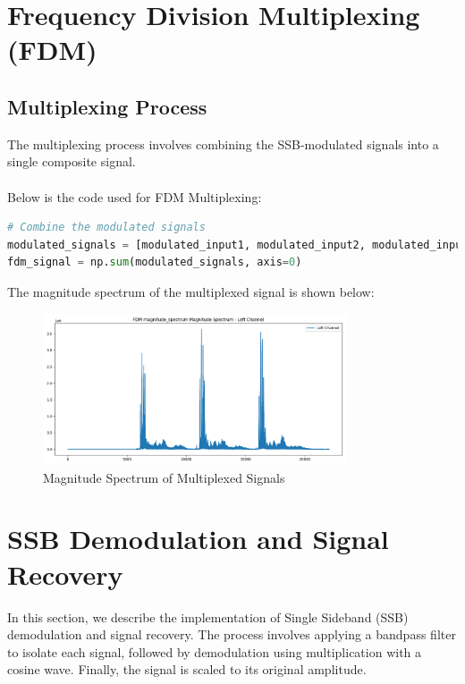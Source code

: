 \documentclass[12pt,a4paper]{article}
\begin{document}
\newpage

\section{Frequency Division Multiplexing (FDM)}

\subsection{Multiplexing Process}
The multiplexing process involves combining the SSB-modulated signals into a single composite signal. \\
\\
Below is the code used for FDM Multiplexing:
\begin{lstlisting}[language=Python, caption=FDM Multiplexing Code]
# Combine the modulated signals
modulated_signals = [modulated_input1, modulated_input2, modulated_input3]
fdm_signal = np.sum(modulated_signals, axis=0)
\end{lstlisting}
The magnitude spectrum of the multiplexed signal is shown below:
\begin{figure}[H]
    \centering
    \includegraphics[width=0.8\textwidth]{../data/modulated/fdm_spectrum/FDM_magnitude_spectrum_magnitude_spectrum.png}
    \caption{Magnitude Spectrum of Multiplexed Signals}
\end{figure}

\newpage

\section{SSB Demodulation and Signal Recovery}

In this section, we describe the implementation of Single Sideband (SSB) demodulation and signal recovery. The process involves applying a bandpass filter to isolate each signal, followed by demodulation using multiplication with a cosine wave. Finally, the signal is scaled to its original amplitude.
\end{document}

